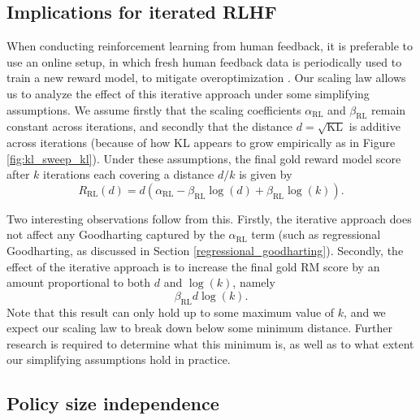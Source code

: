 \documentclass{article}
\theoremstyle{plain}
\begin{document}
    \subsection{Implications for iterated RLHF}\label{iterated_rlhf}

When conducting reinforcement learning from human feedback, it is preferable to use an online setup, in which fresh human feedback data is periodically used to train a new reward model, to mitigate overoptimization \citep{anthropicrlhf1}. Our scaling law allows us to analyze the effect of this iterative approach under some simplifying assumptions. We assume firstly that the scaling coefficients $\alpha_{\text{RL}}$ and $\beta_{\text{RL}}$ remain constant across iterations, and secondly that the distance $d=\sqrt{\text{KL}}$ is additive across iterations (because of how KL appears to grow empirically as in Figure \ref{fig:kl_sweep_kl}). Under these assumptions, the final gold reward model score after $k$ iterations each covering a distance $d/k$ is given by
\[R_{\text{RL}}\left(d\right) = {d}\left(\alpha_{\text{RL}}-\beta_{\text{RL}}\log\left({d}\right)+\beta_{\text{RL}}\log\left(k\right)\right).\]

Two interesting observations follow from this. Firstly, the iterative approach does not affect any Goodharting captured by the $\alpha_{\text{RL}}$ term (such as regressional Goodharting, as discussed in Section \ref{regressional_goodharting}). Secondly, the effect of the iterative approach is to increase the final gold RM score by an amount proportional to both $d$ and $\log\left(k\right)$, namely
\[\beta_{\text{RL}}d\log\left(k\right).\]
Note that this result can only hold up to some maximum value of $k$, and we expect our scaling law to break down below some minimum distance. Further research is required to determine what this minimum is, as well as to what extent our simplifying assumptions hold in practice.



























\subsection{Policy size independence}\label{policysweep_implications}
\end{document}
